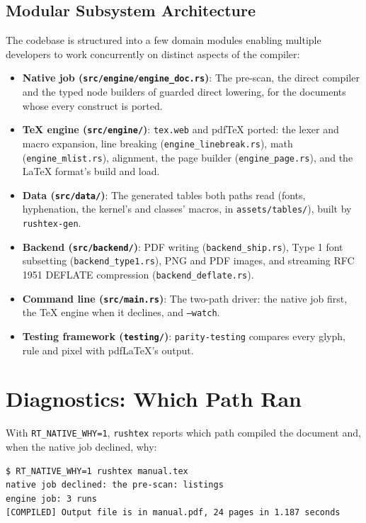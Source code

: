 \documentclass[11pt, a4paper]{article}
\begin{document}
\subsection{Modular Subsystem Architecture}
The codebase is structured into a few domain modules enabling multiple developers to work concurrently on distinct aspects of the compiler:
\begin{itemize}
\item \textbf{Native job (\texttt{src/engine/engine\_doc.rs})}: The pre-scan, the direct compiler and the typed node builders of guarded direct lowering, for the documents whose every construct is ported.
\item \textbf{TeX engine (\texttt{src/engine/})}: \texttt{tex.web} and pdfTeX ported: the lexer and macro expansion, line breaking (\texttt{engine\_linebreak.rs}), math (\texttt{engine\_mlist.rs}), alignment, the page builder (\texttt{engine\_page.rs}), and the LaTeX format's build and load.
\item \textbf{Data (\texttt{src/data/})}: The generated tables both paths read (fonts, hyphenation, the kernel's and classes' macros, in \texttt{assets/tables/}), built by \texttt{rushtex-gen}.
\item \textbf{Backend (\texttt{src/backend/})}: PDF writing (\texttt{backend\_ship.rs}), Type 1 font subsetting (\texttt{backend\_type1.rs}), PNG and PDF images, and streaming RFC 1951 DEFLATE compression (\texttt{backend\_deflate.rs}).
\item \textbf{Command line (\texttt{src/main.rs})}: The two-path driver: the native job first, the TeX engine when it declines, and \texttt{--watch}.
\item \textbf{Testing framework (\texttt{testing/})}: \texttt{parity-testing} compares every glyph, rule and pixel with pdfLaTeX's output.
\end{itemize}

\section{Diagnostics: Which Path Ran}
With \texttt{RT\_NATIVE\_WHY=1}, \texttt{rushtex} reports which path compiled the document and, when the native job declined, why:

\begin{verbatim}
$ RT_NATIVE_WHY=1 rushtex manual.tex
native job declined: the pre-scan: listings
engine job: 3 runs
[COMPILED] Output file is in manual.pdf, 24 pages in 1.187 seconds
\end{verbatim}
\end{document}
